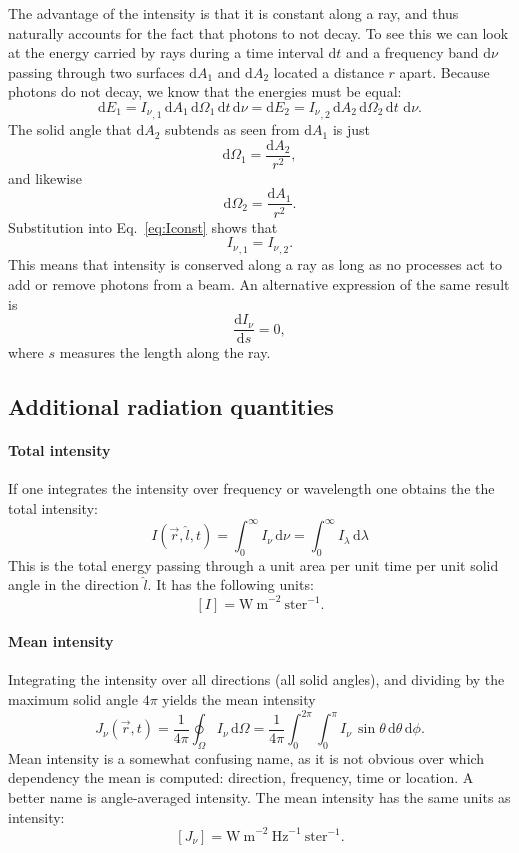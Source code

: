 \documentclass[12pt]{article}
\numberwithin{equation}{section}
\def\dd{\mathrm{d}}
\def\Inu{\ensuremath{I_{\nu}}}
\def\Jnu{\ensuremath{J_{\nu}}}
\def\Ila{\ensuremath{I_{\lambda}}}
\def\dO{\ensuremath{\dd \Omega}}
\def\vr{\ensuremath{\vec{r}}}
\def\ul{\ensuremath{\hat{l}}}
\newcommand{\be}{\begin{equation}}
\newcommand{\ee}{\end{equation}}
\begin{document}
The advantage of the intensity is that it is constant along a ray, and thus naturally accounts for the fact that photons to not decay. To see this we can  look at the energy carried by rays during a time interval $\dd t$ and a frequency band $\dd \nu$ passing through two surfaces $\dd A_1$ and $\dd A_2$ located a distance $r$ apart. Because photons do not decay, we know that the energies must be equal:
\be
\label{eq:Iconst}
\dd E_1 = {\Inu}_{,1} \, \dd A_1 \, \dd \Omega_1 \, \dd t  \, \dd \nu = \dd E_2 = {\Inu}_{,2} \, \dd A_2 \, \dd \Omega_2 \, \dd t \,  \, \dd \nu.
\ee
The solid angle that $\dd A_2$ subtends as seen from $\dd A_1$ is just
\be
\dd \Omega_1 = \frac{\dd A_2}{r^2},
\ee
and likewise
\be
\dd \Omega_2 = \frac{\dd A_1}{r^2}.
\ee
Substitution into Eq.~\ref{eq:Iconst} shows that
\be
{\Inu}_{,1} = {\Inu}_{,2}.
\ee
This means that intensity is conserved along a ray as long as no processes act to add or remove photons from a beam. An alternative expression of the same result is
\be
\frac{\dd \Inu}{\dd s} = 0,
\ee
where $s$ measures the length along the ray.

\subsection{Additional radiation quantities}

\paragraph{Total intensity} 
If one integrates the intensity over frequency or wavelength one obtains the the total intensity:
\be
I(\vr,\ul,t) = \int_0^\infty \Inu \, \dd \nu = \int_0^\infty \Ila \, \dd \lambda
\ee
This is the total energy passing through a unit area per unit time per unit solid angle in the direction $\ul$. It has the following units:
\be 
\left[  I  \right] =  \mathrm{W\ m}^{-2} \ \mathrm{ster}^{-1}.
\ee

\paragraph{Mean intensity} 
Integrating the intensity over all directions (all solid angles), and dividing by the maximum solid angle $4\pi$ yields the mean intensity
\be
\Jnu(\vr,t) =  \frac{1}{4 \pi}  \oint_\Omega \Inu \, \dO =  \frac{1}{4 \pi} \int_0^{2\pi} \int_0^\pi \Inu \, \sin{\theta} \, \dd \theta\, \dd \phi.
\ee
Mean intensity is a somewhat confusing name, as it is not obvious over which dependency the mean is computed: direction, frequency, time or location. A better name is angle-averaged intensity. The mean intensity has the same units as intensity:
\be
\left[  \Jnu  \right] =  \mathrm{W\ m}^{-2} \ \mathrm{Hz}^{-1} \ \mathrm{ster}^{-1}.
\ee
\end{document}
